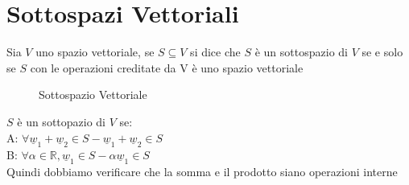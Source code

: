 \chapter{Sottospazi Vettoriali}

Sia $V$ uno spazio vettoriale, se $S\subseteq V$ si dice che $S$ è un sottospazio di $V$ se e solo se $S$ con le operazioni creditate da V è uno spazio vettoriale 
\begin{figure}[H]
	\centering
	\caption[Caption]{Sottospazio Vettoriale}
	\label{fig:sottospaziovettoriale}
\end{figure}

\begin{definizione}
	$S$ è un sottopazio di $V$ se:\\
	A: $\forall \underline{w}_1+\underline{w}_2\in S - \underline{w}_1+\underline{w}_2\in S$\\
	B: $\forall\alpha\in\mathbb{R}, \underline{w}_1\in S - \alpha\underline{w}_1\in S$\\
	Quindi dobbiamo verificare che la somma e il prodotto siano operazioni interne
\end{definizione}

